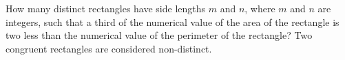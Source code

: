 How many distinct rectangles have side lengths $m$ and $n$, where $m$ and $n$ are integers, such that a third of the numerical value of the area of the rectangle is two less than the numerical value of the perimeter of the rectangle? Two congruent rectangles are considered non-distinct.
